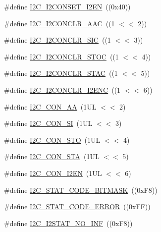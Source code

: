 \begin{DoxyCompactItemize}
\item 
\#define \hyperlink{group__I2C__17XX__40XX_gab836acc31e0572bb0d0db614f0641f15}{I2\-C\-\_\-\-I2\-C\-O\-N\-S\-E\-T\-\_\-\-I2\-E\-N}~((0x40))
\item 
\#define \hyperlink{group__I2C__17XX__40XX_gaa13b19babb8442aa9047f8ecb92a908d}{I2\-C\-\_\-\-I2\-C\-O\-N\-C\-L\-R\-\_\-\-A\-A\-C}~((1 $<$$<$ 2))
\item 
\#define \hyperlink{group__I2C__17XX__40XX_ga36753112210a8c33d566b572b63b753b}{I2\-C\-\_\-\-I2\-C\-O\-N\-C\-L\-R\-\_\-\-S\-I\-C}~((1 $<$$<$ 3))
\item 
\#define \hyperlink{group__I2C__17XX__40XX_ga449d7af35550484c4dfefcddd01095b8}{I2\-C\-\_\-\-I2\-C\-O\-N\-C\-L\-R\-\_\-\-S\-T\-O\-C}~((1 $<$$<$ 4))
\item 
\#define \hyperlink{group__I2C__17XX__40XX_gab6148bf41d7fc32bd259d2f6a7d7667d}{I2\-C\-\_\-\-I2\-C\-O\-N\-C\-L\-R\-\_\-\-S\-T\-A\-C}~((1 $<$$<$ 5))
\item 
\#define \hyperlink{group__I2C__17XX__40XX_ga92718ac11d46f6e32d526749f09d01b2}{I2\-C\-\_\-\-I2\-C\-O\-N\-C\-L\-R\-\_\-\-I2\-E\-N\-C}~((1 $<$$<$ 6))
\item 
\#define \hyperlink{group__I2C__17XX__40XX_gafd39e9ced8b71fd55deb05d7a23752b9}{I2\-C\-\_\-\-C\-O\-N\-\_\-\-A\-A}~(1\-U\-L $<$$<$ 2)
\item 
\#define \hyperlink{group__I2C__17XX__40XX_gad53ba19314d57093aaa5076897604a50}{I2\-C\-\_\-\-C\-O\-N\-\_\-\-S\-I}~(1\-U\-L $<$$<$ 3)
\item 
\#define \hyperlink{group__I2C__17XX__40XX_ga9704c03008de747eb42bde530a67350b}{I2\-C\-\_\-\-C\-O\-N\-\_\-\-S\-T\-O}~(1\-U\-L $<$$<$ 4)
\item 
\#define \hyperlink{group__I2C__17XX__40XX_ga75e0835be79d812d1e6df8b0a5150365}{I2\-C\-\_\-\-C\-O\-N\-\_\-\-S\-T\-A}~(1\-U\-L $<$$<$ 5)
\item 
\#define \hyperlink{group__I2C__17XX__40XX_ga5a696207d04d3694700e427a068409b1}{I2\-C\-\_\-\-C\-O\-N\-\_\-\-I2\-E\-N}~(1\-U\-L $<$$<$ 6)
\item 
\#define \hyperlink{group__I2C__17XX__40XX_gafeb8b5f682a81a2cc32f6c4b720a5e1f}{I2\-C\-\_\-\-S\-T\-A\-T\-\_\-\-C\-O\-D\-E\-\_\-\-B\-I\-T\-M\-A\-S\-K}~((0x\-F8))
\item 
\#define \hyperlink{group__I2C__17XX__40XX_gacfbf48ab1ed4f43314f63898ac827925}{I2\-C\-\_\-\-S\-T\-A\-T\-\_\-\-C\-O\-D\-E\-\_\-\-E\-R\-R\-O\-R}~((0x\-F\-F))
\item 
\#define \hyperlink{group__I2C__17XX__40XX_ga3e2ecdeb466041bb3cf435ccf36564d9}{I2\-C\-\_\-\-I2\-S\-T\-A\-T\-\_\-\-N\-O\-\_\-\-I\-N\-F}~((0x\-F8))

\end{DoxyCompactItemize}
